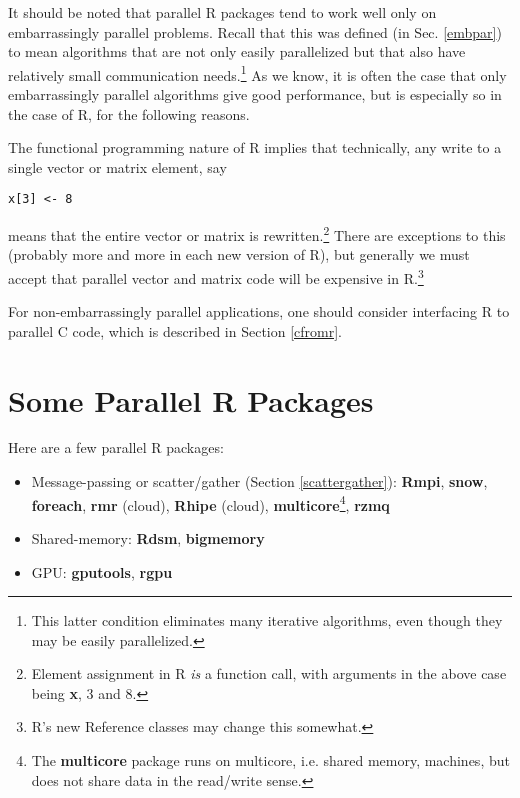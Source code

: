 It should be noted that parallel R packages tend to work well only on
embarrassingly parallel problems.  Recall that this was defined (in Sec.
\ref{embpar}) to mean algorithms that are not only easily parallelized
but that also have relatively small communication needs.\footnote{This
latter condition eliminates many iterative algorithms, even though they
may be easily parallelized.}  As we know, it is often the case that only
embarrassingly parallel algorithms give good performance, but is
especially so in the case of R, for the following reasons.

The functional programming nature of R implies that technically, any
write to a single vector or matrix element, say

\begin{lstlisting}
x[3] <- 8
\end{lstlisting}

means that the entire vector or matrix is rewritten.\footnote{Element
assignment in R {\it is} a function call, with arguments in the above
case being {\bf x}, 3 and 8.}  There are exceptions to this (probably
more and more in each new version of R), but generally we must accept
that parallel vector and matrix code will be expensive in
R.\footnote{R's new Reference classes may change this somewhat.}

For non-embarrassingly parallel applications, one should consider
interfacing R to parallel C code, which is described in Section
\ref{cfromr}.

\section{Some Parallel R Packages}

Here are a few parallel R packages:

\begin{itemize}

\item Message-passing or scatter/gather (Section \ref{scattergather}):
{\bf Rmpi}, {\bf snow}, {\bf foreach}, {\bf rmr} (cloud), {\bf Rhipe}
(cloud), {\bf multicore}\footnote{The {\bf multicore} package runs on
multicore, i.e. shared memory, machines, but does not share data in the
read/write sense.}, {\bf rzmq}

\item Shared-memory:  {\bf Rdsm}, {\bf bigmemory}

\item GPU: {\bf gputools}, {\bf rgpu}

\end{itemize}

